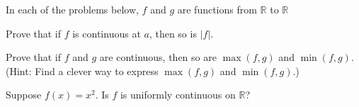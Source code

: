 \documentclass[12pt,letterpaper,boxed,cm]{hmcpset}
\newcommand{\abs}[1]{\left| #1 \right|}
\newcommand{\R}[0]{\mathbb{R}}
\begin{document}
In each of the problems below, $f$ and $g$ are functions from $\R$ to $\R$

\begin{problem}[(1)]
    Prove that if $f$ is continuous at $a$, then so is $\abs{f}$.
\end{problem}

\begin{solution}
    \vfill
\end{solution}
\newpage

\begin{problem}[(2)]
    Prove that if $f$ and $g$ are continuous, then so are $\max(f, g)$ and $\min(f, g)$. (Hint: Find a clever way to express $\max(f, g)$ and $\min(f, g)$.)
\end{problem}

\begin{solution}
    \vfill
\end{solution}
\newpage

\begin{problem}[(3)]
    Suppose $f(x) = x^2$. Is $f$ is uniformly continuous on $\R$?
\end{problem}

\begin{solution}
    \vfill
\end{solution}
\newpage
\end{document}
